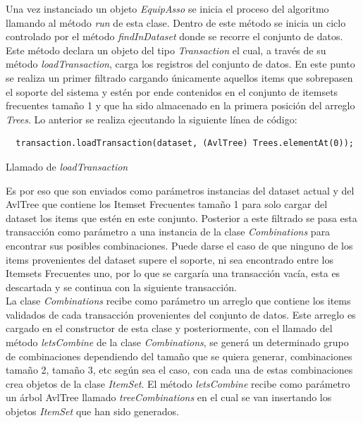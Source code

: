 Una vez instanciado un objeto \textit{EquipAsso} se inicia el proceso del algoritmo llamando al m\'etodo
\textit{run} de esta clase.  Dentro de este m\'etodo se inicia un ciclo controlado por el m\'etodo
\textit{findInDataset} donde se recorre el conjunto de datos.  Este m\'etodo declara un objeto del tipo
\textit{Transaction} el cual, a trav\'es de su m\'etodo \textit{loadTransaction}, carga los registros del
conjunto de datos.  En este punto se realiza un primer filtrado cargando \'unicamente aquellos items que
sobrepasen el soporte del sistema y est\'en por ende contenidos en el conjunto de itemsets frecuentes tama\~no 1
y que ha sido almacenado en la primera posici\'on del arreglo \textit{Trees}. Lo anterior se realiza ejecutando la
siguiente l\'inea de c\'odigo:\\

\begin{codigof}[!h]
\begin{verbatim}
  transaction.loadTransaction(dataset, (AvlTree) Trees.elementAt(0));
\end{verbatim}
\caption{Llamado de \textit{loadTransaction}}
\end{codigof}

Es por eso que son enviados como par\'ametros instancias del dataset actual y del AvlTree que contiene los
Itemset Frecuentes tama\~no 1 para solo cargar del dataset los items que est\'en en este conjunto. Posterior a
este filtrado se pasa esta transacci\'on como par\'ametro a una instancia de la clase \textit{Combinations} para
encontrar sus posibles combinaciones.  Puede darse el caso de que ninguno de los items provenientes del dataset
supere el soporte, ni sea encontrado entre los Itemsets Frecuentes uno, por lo que se cargar\'ia una
transacci\'on vac\'ia, esta es descartada y se continua con la siguiente transacci\'on.\\

La clase \textit{Combinations} recibe como par\'ametro un arreglo que contiene los items validados de cada
transacci\'on provenientes del conjunto de datos.  Este arreglo es cargado en el constructor de esta clase y
posteriormente, con el llamado del m\'etodo \textit{letsCombine} de la clase \textit{Combinations}, se gener\'a
un determinado grupo de combinaciones dependiendo del tama\~no que se quiera generar, combinaciones tama\~no 2,
tama\~no 3,  etc  seg\'un sea el caso, con cada una de estas combinaciones crea objetos de la clase 
\textit{ItemSet}.  El m\'etodo \textit{letsCombine} recibe como par\'ametro un \'arbol AvlTree llamado
\textit{treeCombinations} en el cual se van insertando los objetos \textit{ItemSet} que han sido generados.\\

